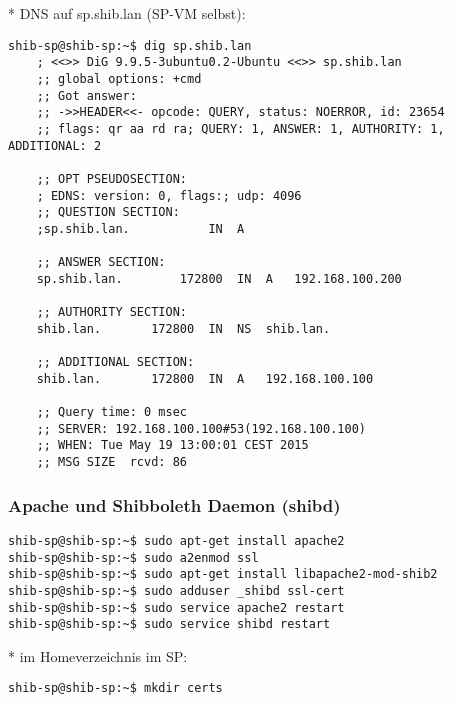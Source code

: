 * DNS auf sp.shib.lan (SP-VM selbst):
\begin{lstlisting}
shib-sp@shib-sp:~$ dig sp.shib.lan
	; <<>> DiG 9.9.5-3ubuntu0.2-Ubuntu <<>> sp.shib.lan
	;; global options: +cmd
	;; Got answer:
	;; ->>HEADER<<- opcode: QUERY, status: NOERROR, id: 23654
	;; flags: qr aa rd ra; QUERY: 1, ANSWER: 1, AUTHORITY: 1, ADDITIONAL: 2

	;; OPT PSEUDOSECTION:
	; EDNS: version: 0, flags:; udp: 4096
	;; QUESTION SECTION:
	;sp.shib.lan.			IN	A

	;; ANSWER SECTION:
	sp.shib.lan.		172800	IN	A	192.168.100.200

	;; AUTHORITY SECTION:
	shib.lan.		172800	IN	NS	shib.lan.

	;; ADDITIONAL SECTION:
	shib.lan.		172800	IN	A	192.168.100.100

	;; Query time: 0 msec
	;; SERVER: 192.168.100.100#53(192.168.100.100)
	;; WHEN: Tue May 19 13:00:01 CEST 2015
	;; MSG SIZE  rcvd: 86
\end{lstlisting}

\subsubsection{Apache und Shibboleth Daemon (shibd)}
\begin{lstlisting}
shib-sp@shib-sp:~$ sudo apt-get install apache2
shib-sp@shib-sp:~$ sudo a2enmod ssl
shib-sp@shib-sp:~$ sudo apt-get install libapache2-mod-shib2
shib-sp@shib-sp:~$ sudo adduser _shibd ssl-cert
shib-sp@shib-sp:~$ sudo service apache2 restart
shib-sp@shib-sp:~$ sudo service shibd restart
\end{lstlisting}
* im Homeverzeichnis im SP:
\begin{lstlisting}
shib-sp@shib-sp:~$ mkdir certs
\end{lstlisting}

